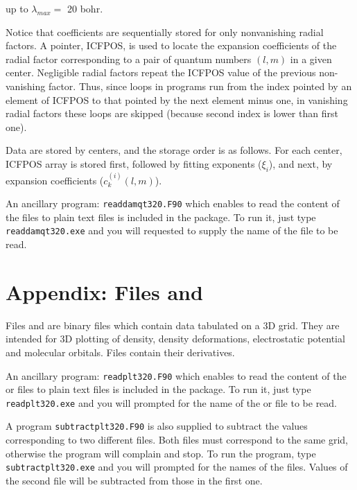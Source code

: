 \documentclass[10pt]{article}
\begin{document}
up to $\lambda_{max} = $ 20 bohr.

Notice that coefficients are sequentially stored for only nonvanishing radial
factors. A pointer, ICFPOS, is used to locate the expansion coefficients of
the radial factor corresponding to a pair of quantum
numbers $(l,m)$ in a given center. Negligible radial factors repeat the ICFPOS 
value of the previous non-vanishing factor. Thus, since loops in programs
run from the index pointed by an element of ICFPOS to that pointed by the next element 
minus one, in vanishing radial factors these loops are skipped (because second index
is lower than first one).

Data are stored by centers, and the storage order is as follows. 
For each center, ICFPOS array is stored first,
followed by fitting exponents ($\xi_i$), and next, by expansion coefficients
($c_k^{(i)}(l,m)$).

An ancillary program: \texttt{readdamqt320.F90} which enables to read
the content of the \damqt{ } files to plain text files is included in the
package. To run it, just type \texttt{readdamqt320.exe} and you will
requested to supply the name of the \damqt{ } file to be read.

\section{Appendix: Files \plt{ } and \pltd\label{A3}}

Files \plt{} and \pltd{}
are binary files which contain data
tabulated on a 3D grid. They are intended for 3D plotting of density, density
deformations, electrostatic potential and molecular orbitals. Files \pltd{ }
contain their derivatives.

An ancillary program: \texttt{readplt320.F90} which enables to read
the content of the \plt{ } or \pltd{ } files to plain text files is included
in the package. To run it, just type \texttt{readplt320.exe} and you will
prompted for the name of the \plt{ } or \pltd{ } file to be read.

A program \texttt{subtractplt320.F90} is also supplied to subtract the values
corresponding to two different \plt{ } files. Both \plt{ } files must
correspond to the same grid, otherwise the program will complain and stop.
To run the program, type \texttt{subtractplt320.exe}  and you will
prompted for the names of the \plt{ } files. Values of the second file
will be subtracted from those in the first one.
\end{document}
